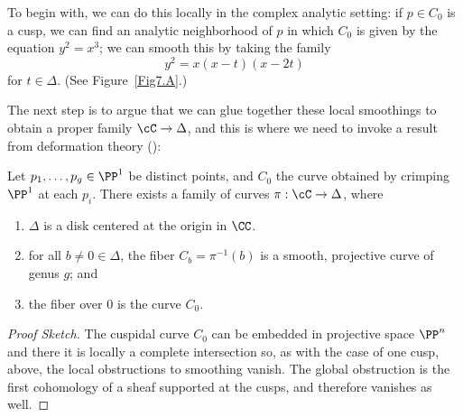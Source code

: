 To begin with, we can do this locally in the complex analytic setting: if $p \in C_0$ is a cusp, we can find an analytic neighborhood of $p$ in which $C_0$ is given by the equation $y^2 = x^3$; we can smooth this by taking the family
$$
y^2 = x(x-t)(x-2t)
$$
for $t\in \Delta$.
(See Figure~\ref{Fig7.A}.)

The next step is to argue that we can glue together these local smoothings to obtain a proper family $\cC \to \Delta$, and this is where we need to invoke a result from deformation theory (\cite{MR2223408}):

\begin{lemma}\label{specialization to cuspidal curve}
Let $p_1,\dots,p_g \in \PP^1$ be distinct points, and $C_0$ the curve obtained by 
crimping $\PP^1$ at each $p_i$. There exists a family of curves $\pi : \cC \to \Delta$, where
\begin{enumerate}
\item $\Delta$ is a disk centered at the origin in $\CC$.
\item for all $b \neq 0 \in \Delta$, the fiber $C_b = \pi^{-1}(b)$ is a smooth, projective curve of genus $g$;  and
\item the fiber over $0$ is the curve $C_0$.
\end{enumerate}
\end{lemma}

\begin{proof}[Proof Sketch]
The cuspidal curve $C_{0}$ can be embedded in projective space $\PP^{n}$ and there
it is locally a complete intersection so, as with the case of one cusp, above, the local obstructions
to smoothing vanish. The global obstruction is the first cohomology of a sheaf supported at the cusps,
and therefore vanishes as well.
\end{proof}


